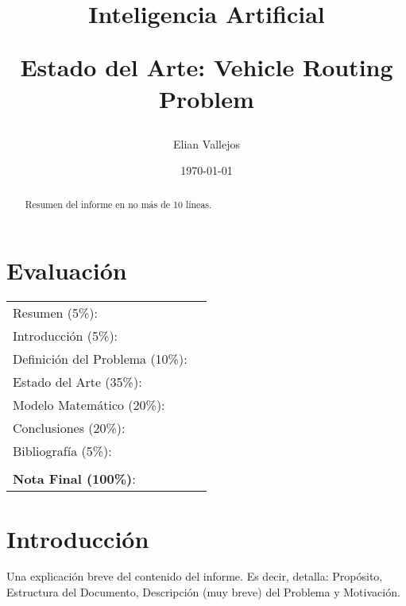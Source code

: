 \documentclass[letter, 10pt]{article}
\begin{document}
\title{Inteligencia Artificial \\ \begin{Large}Estado del Arte: Vehicle Routing Problem\end{Large}}
\author{Elian  Vallejos}
\date{\today}
\maketitle


\section*{Evaluaci\'on}

\begin{tabular}{ll}
Resumen (5\%): & \underline{\hspace{2cm}} \\
Introducci\'on (5\%):  & \underline{\hspace{2cm}} \\
Definici\'on del Problema (10\%):  & \underline{\hspace{2cm}} \\
Estado del Arte (35\%):  & \underline{\hspace{2cm}} \\
Modelo Matem\'atico (20\%): &  \underline{\hspace{2cm}}\\
Conclusiones (20\%): &  \underline{\hspace{2cm}}\\
Bibliograf\'ia (5\%): & \underline{\hspace{2cm}}\\
 &  \\
\textbf{Nota Final (100\%)}:   & \underline{\hspace{2cm}}
\end{tabular}
\vspace{2cm}


\begin{abstract}
Resumen del informe en no m\'as de 10 l\'ineas.
\end{abstract}

\section{Introducci\'on}
Una explicaci\'on breve del contenido del informe. Es decir, detalla: Prop\'osito, Estructura del Documento, Descripci\'on (muy breve) del Problema y Motivaci\'on.
\end{document}
